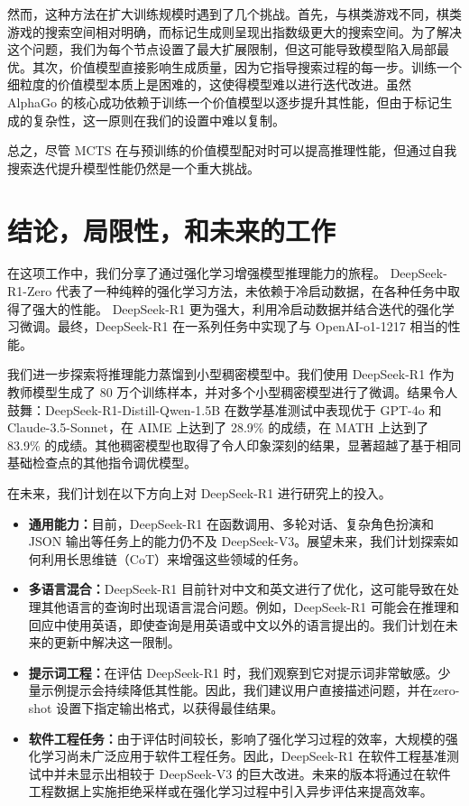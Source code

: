 \documentclass[lang=cn,a4paper,newtx]{elegantpaper}
\newcommand{\dsri}{DeepSeek-R1}
\newcommand{\dsro}{DeepSeek-R1-Zero}
\begin{document}
然而，这种方法在扩大训练规模时遇到了几个挑战。首先，与棋类游戏不同，棋类游戏的搜索空间相对明确，而标记生成则呈现出指数级更大的搜索空间。为了解决这个问题，我们为每个节点设置了最大扩展限制，但这可能导致模型陷入局部最优。其次，价值模型直接影响生成质量，因为它指导搜索过程的每一步。训练一个细粒度的价值模型本质上是困难的，这使得模型难以进行迭代改进。虽然 AlphaGo 的核心成功依赖于训练一个价值模型以逐步提升其性能，但由于标记生成的复杂性，这一原则在我们的设置中难以复制。

总之，尽管 MCTS 在与预训练的价值模型配对时可以提高推理性能，但通过自我搜索迭代提升模型性能仍然是一个重大挑战。

\section{结论，局限性，和未来的工作}

在这项工作中，我们分享了通过强化学习增强模型推理能力的旅程。 \dsro{} 代表了一种纯粹的强化学习方法，未依赖于冷启动数据，在各种任务中取得了强大的性能。 \dsri{} 更为强大，利用冷启动数据并结合迭代的强化学习微调。最终，\dsri{} 在一系列任务中实现了与 OpenAI-o1-1217 相当的性能。

我们进一步探索将推理能力蒸馏到小型稠密模型中。我们使用 \dsri{} 作为教师模型生成了 80 万个训练样本，并对多个小型稠密模型进行了微调。结果令人鼓舞：DeepSeek-R1-Distill-Qwen-1.5B 在数学基准测试中表现优于 GPT-4o 和 Claude-3.5-Sonnet，在 AIME 上达到了 28.9\% 的成绩，在 MATH 上达到了 83.9\% 的成绩。其他稠密模型也取得了令人印象深刻的结果，显著超越了基于相同基础检查点的其他指令调优模型。

在未来，我们计划在以下方向上对 \dsri{} 进行研究上的投入。

\begin{itemize}[topsep=0pt]
  \item \textbf{通用能力：}目前，\dsri{} 在函数调用、多轮对话、复杂角色扮演和 JSON 输出等任务上的能力仍不及 DeepSeek-V3。展望未来，我们计划探索如何利用长思维链（CoT）来增强这些领域的任务。
  \item \textbf{多语言混合：}\dsri{} 目前针对中文和英文进行了优化，这可能导致在处理其他语言的查询时出现语言混合问题。例如，\dsri{} 可能会在推理和回应中使用英语，即使查询是用英语或中文以外的语言提出的。我们计划在未来的更新中解决这一限制。
  \item \textbf{提示词工程：}在评估 \dsri{} 时，我们观察到它对提示词非常敏感。少量示例提示会持续降低其性能。因此，我们建议用户直接描述问题，并在zero-shot 设置下指定输出格式，以获得最佳结果。
  \item  \textbf{软件工程任务：}由于评估时间较长，影响了强化学习过程的效率，大规模的强化学习尚未广泛应用于软件工程任务。因此，DeepSeek-R1 在软件工程基准测试中并未显示出相较于 DeepSeek-V3 的巨大改进。未来的版本将通过在软件工程数据上实施拒绝采样或在强化学习过程中引入异步评估来提高效率。
\end{itemize}
\end{document}
